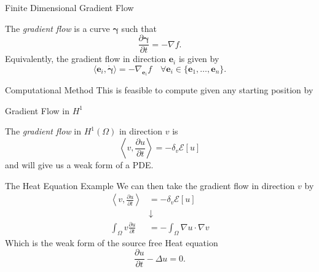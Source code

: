 \documentclass[usenames,dvipsnames]{beamer}
\theoremstyle{definition}
\theoremstyle{theorem}
\begin{document}
 
        
        \begin{frame}{Finite Dimensional Gradient Flow}
        
        \begin{definition}
        The \emph{gradient flow} is a curve $\boldsymbol{\gamma}$ such that
        \[
        \frac{\partial \boldsymbol\gamma}{\partial t} = -\nabla f.
        \]
        Equivalently, the gradient flow in direction $\mathbf{e}_i$ is given by
            \[
            \langle \mathbf{e}_i ,\boldsymbol{\dot{\gamma}}\rangle = -\nabla_{\mathbf{e}_i} f \quad \forall \mathbf{e}_i \in \{\mathbf{e}_1,\dots,\mathbf{e}_n\}.
            \]
        \end{definition}
        \end{frame}
        
        \begin{frame}{Computational Method}
            This is feasible to compute given any starting position by
        \end{frame}
        
        
  
        
    
        \begin{frame}{Gradient Flow in $H^1$}
        \begin{definition}
            The \emph{gradient flow} in $H^1(\Omega)$ in direction $v$ is
            \[
            \left\langle v,\frac{\partial u}{\partial t}\right\rangle=-\delta_v \mathcal{E}[u]
            \]
            and will give us a weak form of a PDE.
        \end{definition}
        \end{frame}
        
        \begin{frame}{The Heat Equation Example}
            We can then take the gradient flow in direction $v$ by
            \begin{align*}
            \left\langle v,\frac{\partial u}{\partial t}\right\rangle&=-\delta_v \mathcal{E}[u]\\
            &\downarrow\\
            \int_\Omega v\frac{\partial u}{\partial t} &= -\int_\Omega \nabla u \cdot \nabla v 
            \end{align*}
            Which is the weak form of the source free Heat equation
            \[
            \frac{\partial u}{\partial t} - \Delta u = 0.
            \]
        \end{frame}
        
\end{document}
